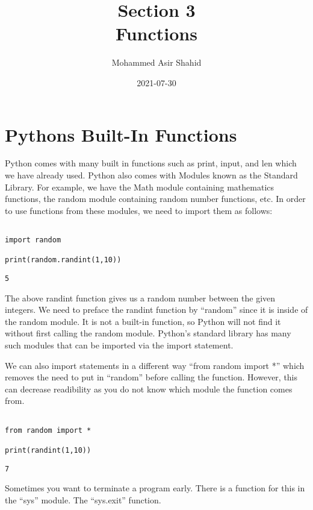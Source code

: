 \documentclass[11pt]{article}
\author{Mohammed Asir Shahid}
\date{2021-07-30}
\title{Section 3\\\medskip
\large Functions}
\begin{document}
\maketitle
\tableofcontents


\section{Pythons Built-In Functions}
\label{sec:orgd324a15}

Python comes with many built in functions such as print, input, and len which we have already used. Python also comes with Modules known as the Standard Library. For example, we have the Math module containing mathematics functions, the random module containing random number functions, etc. In order to use functions from these modules, we need to import them as follows:

\begin{verbatim}

import random

print(random.randint(1,10))

\end{verbatim}

\begin{verbatim}
5
\end{verbatim}


The above randint function gives us a random number between the given integers. We need to preface the randint function by ``random'' since it is inside of the random module. It is not a built-in function, so Python will not find it without first calling the random module. Python's standard library has many such modules that can be imported via the import statement.

We can also import statements in a different way ``from random import *'' which removes the need to put in ``random'' before calling the function. However, this can decrease readibility as you do not know which module the function comes from.

\begin{verbatim}

from random import *

print(randint(1,10))

\end{verbatim}

\begin{verbatim}
7
\end{verbatim}


Sometimes you want to terminate a program early. There is a function for this in the ``sys'' module. The ``sys.exit'' function.
\end{document}
